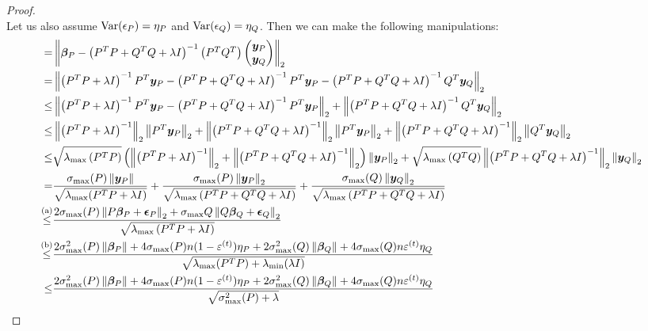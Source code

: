 \documentclass{article} %
\newcommand{\norm}[1]{\left\lVert#1\right\rVert}
\begin{document}
\begin{appendices}
\begin{proof}
\begin{equation*}
	\end{equation*}
	Let us also assume $\mathrm{Var}({\epsilon}_P) = \eta_P$ and $\mathrm{Var}({\epsilon}_Q) = \eta_Q$. Then we can make the following manipulations:
	\begin{align*}
		= &\norm{\vbeta_P - \left(P^T P + Q^T Q + \lambda I\right)^{-1}\begin{pmatrix}P^T Q^T\end{pmatrix}\begin{pmatrix}\vy_P \\ \vy_Q \end{pmatrix}}_2 &&\\
		= &\norm{\left(P^T P + \lambda I\right)^{-1} P^T \vy_P - \left(P^T P + Q^T Q + \lambda I\right)^{-1}P^T \vy_P  - \left(P^T P + Q^T Q + \lambda I\right)^{-1}Q^T \vy_Q}_2 &&\\
		\leq &\norm{\left(P^T P + \lambda I\right)^{-1} P^T \vy_P -\left(P^T P + Q^T Q+ \lambda I\right)^{-1}P^T \vy_P}_2 + \norm{\left(P^T P + Q^T Q+ \lambda I\right)^{-1}Q^T \vy_Q}_2 &&\\
		\leq& \norm{\left(P^T P + \lambda I\right)^{-1}}_2 \norm{P^T\vy_P}_2 + \norm{\left(P^T P + Q^T Q + \lambda I\right)^{-1}}_2\norm{P^T \vy_P}_2 + \norm{\left(P^T P + Q^T Q + \lambda I\right)^{-1}}_2\norm{Q^T \vy_Q}_2&&\\
		\leq & \sqrt{\lambda_{\max}\left(P^T P\right)}\left(\norm{\left(P^TP + \lambda I\right)^{-1}}_2+\norm{\left(P^T P + Q^T Q + \lambda I\right)^{-1}}_2\right)\norm{\vy_P}_2 + \sqrt{\lambda_{\max}\left(Q^T Q\right)}\norm{\left(P^T P + Q^T Q + \lambda I\right)^{-1}}_2\norm{\vy_Q}_2 &&\\
		= &\frac{\sigma_{\max}(P)\norm{\vy_P}}{\sqrt{\lambda_{\max}(P^TP + \lambda I)}} + \frac{\sigma_{\max}(P)\norm{\vy_P}_2}{\sqrt{\lambda_{\max}\left(P^T P + Q^T Q + \lambda I\right)}} + \frac{\sigma_{\max}(Q)\norm{\vy_Q}_2}{\sqrt{\lambda_{\max}\left(P^T P + Q^T Q + \lambda I\right)}} &&\\
		\overset{\mathrm{(a)}}{\leq} &\frac{2\sigma_{\max}(P)\norm{P\vbeta_P + \veps_P}_2 + \sigma_{\max}{Q}\norm{Q\vbeta_Q + \veps_Q}_2}{\sqrt{\lambda_{\max}\left(P^T P + \lambda I\right)}} &&\\
		\overset{\mathrm{(b)}}{\leq} & \frac{2\sigma^2_{\max}(P)\norm{\vbeta_P} + 4\sigma_{\max}(P)n(1-\varepsilon^{(t)})\eta_P + 2\sigma^2_{\max}(Q)\norm{\vbeta_Q} + 4\sigma_{\max}(Q)n\varepsilon^{(t)}\eta_Q}{\sqrt{\lambda_{\max}(P^T P) + \lambda_{\min}(\lambda I)}} &&\\
		\leq &\frac{2\sigma^2_{\max}(P)\norm{\vbeta_P} + 4\sigma_{\max}(P)n(1-\varepsilon^{(t)})\eta_P + 2\sigma^2_{\max}(Q)\norm{\vbeta_Q} + 4\sigma_{\max}(Q)n\varepsilon^{(t)}\eta_Q}{\sqrt{\sigma^2_{\max}(P) + \lambda}} &&\\
	\end{align*}
	

\end{proof}
\end{appendices}
\end{document}
